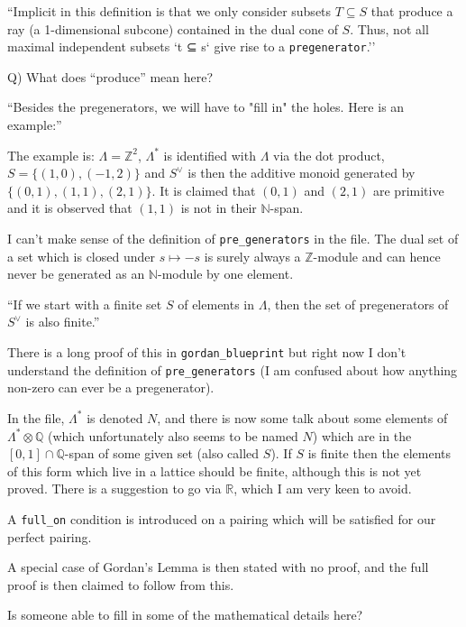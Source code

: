 \documentclass[english]{amsart}
\newcommand{\N}{\mathbb{N}}
\newcommand{\Q}{\mathbb{Q}}
\newcommand{\R}{\mathbb{R}}
\newcommand{\Z}{\mathbb{Z}}
\begin{document}
``Implicit in this definition is that we only consider subsets $T\subseteq S$ that produce a ray (a 1-dimensional subcone) contained in the dual cone of $S$.  Thus, not all maximal independent subsets `t ⊆ s` give rise to a {\tt pregenerator}.''

Q) What does ``produce'' mean here?

``Besides the pregenerators, we will have to "fill in" the holes.  Here is an example:''

The example is: $\Lambda=\Z^2$, $\Lambda^*$ is identified with $\Lambda$ via the dot product, $S=\{(1,0),(-1,2)\}$ and $S^\vee$ is then the additive monoid generated by $\{(0,1),(1,1),(2,1)\}$. It is claimed that $(0,1)$ and $(2,1)$ are primitive and it is observed that $(1,1)$ is not in their $\N$-span.

I can't make sense of the definition of {\tt pre\_generators} in the file. The dual set of a set which is closed under $s\mapsto -s$ is surely always a $\Z$-module and can hence never be generated as an $\N$-module by one element.

``If we start with a finite set $S$ of elements in $\Lambda$, then the set of pregenerators of $S^\vee$ is also finite.''

There is a long proof of this in {\tt gordan\_blueprint} but right now I don't understand the definition of {\tt pre\_generators} (I am confused about how anything non-zero can ever be a pregenerator).

In the file, $\Lambda^*$ is denoted $N$, and there is now some talk about some elements of $\Lambda^*\otimes\Q$ (which unfortunately also seems to be named $N$) which are in the $[0,1]\cap\Q$-span of some given set (also called $S$). If $S$ is finite then the elements of this form which live in a lattice should be finite, although this is not yet proved. There is a suggestion to go via $\R$, which I am very keen to avoid.

A {\tt full\_on} condition is introduced on a pairing which will be satisfied for our perfect pairing.

A special case of Gordan's Lemma is then stated with no proof, and the full proof is then claimed to follow from this.

Is someone able to fill in some of the mathematical details here?
\end{document}
